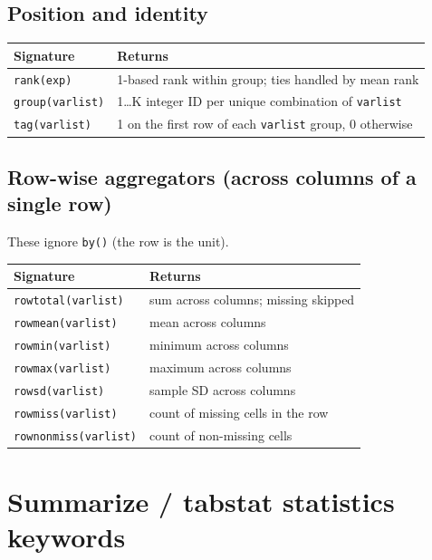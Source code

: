\documentclass[11pt,letterpaper]{article}
\begin{document}
\subsection{Position and identity}

\begin{center}
\begin{tabular}{ll}
\toprule
Signature & Returns \\
\midrule
\texttt{rank(exp)} & 1-based rank within group; ties handled by mean rank \\
\texttt{group(varlist)} & 1\ldots K integer ID per unique combination of \texttt{varlist} \\
\texttt{tag(varlist)} & 1 on the first row of each \texttt{varlist} group, 0 otherwise \\
\bottomrule
\end{tabular}
\end{center}

\subsection{Row-wise aggregators (across columns of a single row)}

These ignore \texttt{by()} (the row is the unit).

\begin{center}
\begin{tabular}{ll}
\toprule
Signature & Returns \\
\midrule
\texttt{rowtotal(varlist)} & sum across columns; missing skipped \\
\texttt{rowmean(varlist)} & mean across columns \\
\texttt{rowmin(varlist)} & minimum across columns \\
\texttt{rowmax(varlist)} & maximum across columns \\
\texttt{rowsd(varlist)} & sample SD across columns \\
\texttt{rowmiss(varlist)} & count of missing cells in the row \\
\texttt{rownonmiss(varlist)} & count of non-missing cells \\
\bottomrule
\end{tabular}
\end{center}

\section{Summarize / tabstat statistics keywords}
\end{document}
